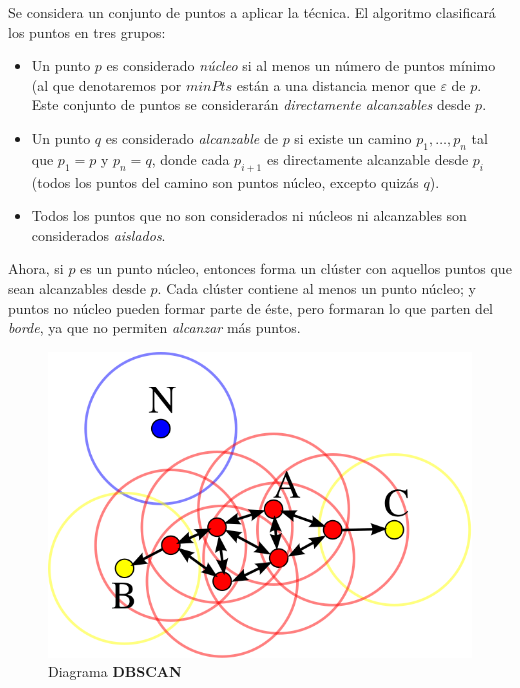 \documentclass[a4paper, 12pt, spanish]{article}
\begin{document}
Se considera un conjunto de puntos a aplicar la t\'ecnica. El algoritmo clasificar\'a los puntos en tres grupos: 

\begin{itemize}
	\item Un punto $p$ es considerado \textit{n\'ucleo} si al menos un n\'umero de puntos m\'inimo (al que denotaremos por $minPts$ est\'an a una distancia menor que $\varepsilon$ de $p$. Este conjunto de puntos se considerar\'an \textit{directamente alcanzables} desde $p$.
	\item Un punto $q$ es considerado \textit{alcanzable} de $p$ si existe un camino $p_1, \ldots, p_n$ tal que $p_1=p$ y $p_n=q$, donde cada $p_{i+1}$ es directamente alcanzable desde $p_i$ (todos los puntos del camino son puntos n\'ucleo, excepto quiz\'as $q$).
	\item Todos los puntos que no son considerados ni n\'ucleos ni alcanzables son considerados \textit{aislados}.
\end{itemize}

Ahora, si $p$ es un punto n\'ucleo, entonces forma un cl\'uster con aquellos puntos que sean alcanzables desde $p$. Cada cl\'uster contiene al menos un punto n\'ucleo; y puntos no n\'ucleo pueden formar parte de \'este, pero formaran lo que parten del \textit{borde}, ya que no permiten \textit{alcanzar} m\'as puntos. \\

\begin{figure}[H]\label{fig:DBSCAN}
	\centering
	\includegraphics[scale=.4]{DBSCAN.png}
\caption{Diagrama \textbf{DBSCAN}}
\end{figure}
\end{document}
